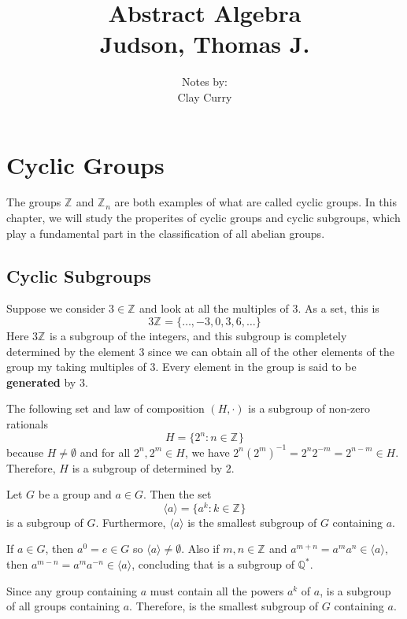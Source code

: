 \documentclass[11pt]{article} %
\title{Abstract Algebra \\ Judson, Thomas J.}
\author{Notes by:  \\ Clay Curry}
\date{}
\newcommand\br{\vspace{15 pt}}
\newcommand\Z[1]{\text{$\mathbb{Z}^{#1}$}}
\newcommand\Q[1]{\text{$\mathbb{Q}^{#1}$}}
\newcommand\cyc[1]{\text{$\langle {#1} \rangle$}}
\newcommand\set[1]{\{#1\}}
\begin{document}
\maketitle
\setcounter{section}{3}
\section{Cyclic Groups}

The groups $\Z{}$ and $\Z{}_n$ are both examples of what are called cyclic groups. In this chapter, we will study the properites of cyclic groups and cyclic subgroups, which play a fundamental part in the classification of all abelian groups.

\subsection{Cyclic Subgroups}

\example{$3\Z{}$}
{
Suppose we consider $3 \in \Z{}$ and look at all the multiples of $3$. As a set, this is
$$
3 \Z{} = \set{\ldots, -3, 0, 3, 6, \ldots}
$$
Here $3\Z{}$ is a subgroup of the integers, and this subgroup is completely determined by the element $3$ since we can obtain all of the other elements of the group my taking multiples of $3$. Every element in the group is said to be \textbf{generated} by $3$.
}

\br

{
The following set and law of composition $(H, \cdot)$ is a subgroup of non-zero rationals \Q{*}
$$
H = \set{2^{n} : n \in \Z{}}
$$
because $H \ne \emptyset$ and for all $2^n,2^m \in H$, we have $2^n (2^{m})^{-1} = 2^n 2^{-m} = 2^{n-m} \in H$. Therefore, $H$ is a subgroup of \Q{*} determined by $2$. 
}

\br

{
Let $G$ be a group and $a \in G$. Then the set
$$
\cyc{a} = \set{a^k : k \in \Z{}}
$$
is a subgroup of $G$. Furthermore, $\cyc{a}$ is the smallest subgroup of $G$ containing $a$.
}
{
If $a \in G$, then $a^0 = e \in G$ so $\cyc{a} \ne \emptyset$. Also if $m, n \in \Z{}$ and $a^{m+n}=a^m a^n \in \cyc a$, then $a^{m-n} = a^m a^{-n} \in \cyc{a}$, concluding that \cyc a is a subgroup of $\Q{*}$.

Since any group containing $a$ must contain all the powers $a^k$ of $a$, \cyc a is a subgroup of all groups containing $a$. Therefore, \cyc a is the smallest subgroup of $G$ containing $a$.
}
\end{document}
